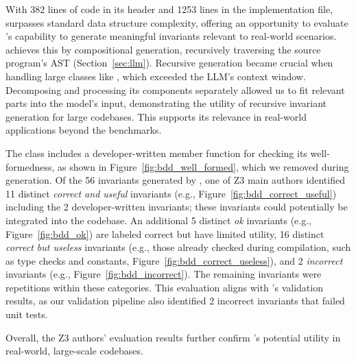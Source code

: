 With 382 lines of code in its header and 1253 lines in the implementation file,  surpasses standard data structure complexity, offering an opportunity to evaluate \tech's capability to generate meaningful invariants relevant to real-world scenarios. 
\tech achieves this by compositional generation, recursively traversing the source program's AST (Section~\ref{sec:llm}). 
Recursive generation became crucial when handling large classes like , which exceeded the LLM’s context window. Decomposing and processing its components separately allowed us to fit relevant parts into the model’s input, demonstrating the utility of recursive invariant generation for large codebases. This supports its relevance in real-world applications beyond the benchmarks.

The   class includes a developer-written member function for checking its well-formedness, as shown in Figure~\ref{fig:bdd_well_formed}, which we removed during \tech generation. Of the 56 invariants generated by \tech, one of Z3 main authors identified 11 distinct \textit{correct and useful} invariants (e.g., Figure~\ref{fig:bdd_correct_useful}) including the 2 developer-written invariants; these invariants could potentially be integrated into the codebase.
An additional 5 distinct \textit{ok} invariants (e.g., Figure~\ref{fig:bdd_ok})  are labeled correct but have limited utility, 16 distinct \textit{correct but useless} invariants (e.g., those already checked during compilation, such as type checks and constants, Figure~\ref{fig:bdd_correct_useless}), and 2 \textit{incorrect} invariants (e.g., Figure~\ref{fig:bdd_incorrect}). The remaining invariants were repetitions within these categories. This evaluation aligns with \tech's validation results, as our validation pipeline also identified 2 incorrect invariants that failed  unit tests.

Overall, the Z3 authors' evaluation results further confirm \tech's potential utility in real-world, large-scale codebases.


